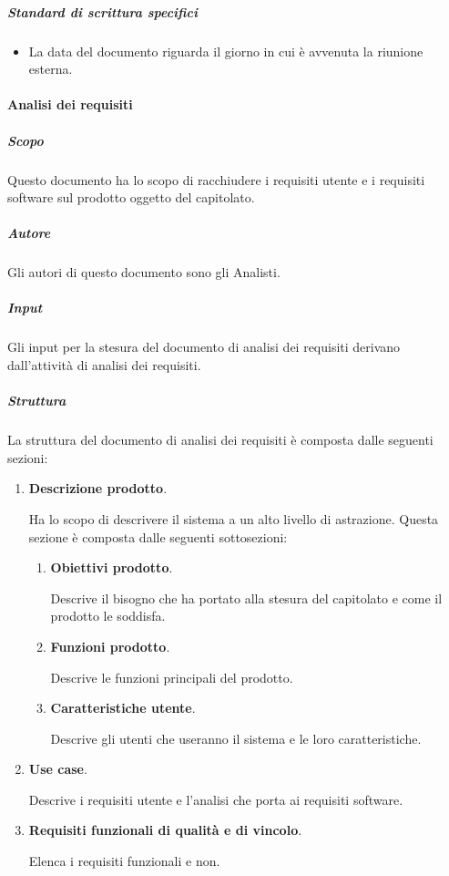 \subparagraph{Standard di scrittura specifici}
\begin{itemize}
    \item La data del documento riguarda il giorno in cui è avvenuta la riunione esterna.
\end{itemize}

\paragraph{Analisi dei requisiti}

\subparagraph{Scopo}
Questo documento ha lo scopo di racchiudere i requisiti utente e i requisiti software sul prodotto oggetto del capitolato.

\subparagraph{Autore}
Gli autori di questo documento sono gli Analisti.

\subparagraph{Input}
Gli input per la stesura del documento di analisi dei requisiti derivano dall'attività di analisi dei requisiti.

\subparagraph{Struttura}
La struttura del documento di analisi dei requisiti è composta dalle seguenti sezioni:
\begin{enumerate}
    \item \textbf{Descrizione prodotto}.
    
    Ha lo scopo di descrivere il sistema a un alto livello di astrazione.
    Questa sezione è composta dalle seguenti sottosezioni:
    \begin{enumerate}
        \item \textbf{Obiettivi prodotto}.
        
        Descrive il bisogno che ha portato alla stesura del capitolato e come il prodotto le soddisfa.
        
        \item \textbf{Funzioni prodotto}.

        Descrive le funzioni principali del prodotto.

        \item \textbf{Caratteristiche utente}.
        
        Descrive gli utenti che useranno il sistema e le loro caratteristiche.
    \end{enumerate}

    \item \textbf{Use case}.
    
    Descrive i requisiti utente e l'analisi che porta ai requisiti software.
    
    \item \textbf{Requisiti funzionali di qualità e di vincolo}.
    
    Elenca i requisiti funzionali e non.
    
\end{enumerate}

